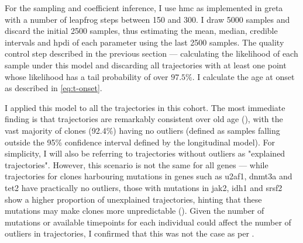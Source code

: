For the sampling and coefficient inference, I use \ac{hmc} as implemented in greta \cite{Golding2018-zp} with a number of leapfrog steps between 150 and 300. I draw 5000 samples and discard the initial 2500 samples, thus estimating the mean, median, credible intervals and \ac{hpdi} of each parameter using the last 2500 samples. The quality control step described in the previous section --- calculating the likelihood of each sample under this model and discarding all trajectories with at least one point whose likelihood has a tail probability of over $97.5\%$. I calculate the age at onset as described in \eqref{eq:t-onset}.

I applied this model to all the trajectories in this cohort. The most immediate finding is that trajectories are remarkably consistent over old age (), with the vast majority of clones (92.4\%) having no outliers (defined as samples falling outside the 95\% confidence interval defined by the longitudinal model). For simplicity, I will also be referring to trajectories without outliers as "explained trajectories". However, this scenario is not the same for all genes --- while trajectories for clones harbouring mutations in genes such as \ac{u2af1}, \ac{dnmt3a} and \ac{tet2} have practically no outliers, those with mutations in \ac{jak2}, \ac{idh1} and \ac{srsf2} show a higher proportion of unexplained trajectories, hinting that these mutations may make clones more unpredictable (). Given the number of mutations or available timepoints for each individual could affect the number of outliers in trajectories, I confirmed that this was not the case as per . 

\begin{figure}[!ht]
	\label{fig:ch-trajectories-examples}
\end{figure}

\begin{figure}[!ht]
	\label{fig:ch-trajectories-explained-gene}
\end{figure}

